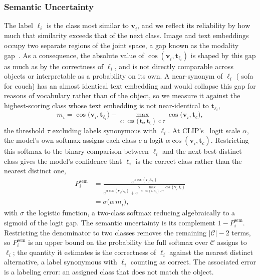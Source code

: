 \subsubsection{Semantic Uncertainty}
The label $\ell^{}_i$ is the class most similar to $\mathbf{v}^{}_i$, and we reflect its reliability by how much that similarity exceeds that of the next class. Image and text embeddings occupy two separate regions of the joint space, a gap known as the modality gap~\cite{liang2022mind}. As a consequence, the absolute value of $\cos(\mathbf{v}^{}_i, \mathbf{t}^{}_{\ell_i})$ is shaped by this gap as much as by the correctness of $\ell^{}_i$, and is not directly comparable across objects or interpretable as a probability on its own. A near-synonym of $\ell^{}_i$ (\eg{} sofa for couch) has an almost identical text embedding and would collapse this gap for reasons of vocabulary rather than of the object, so we measure it against the highest-scoring class whose text embedding is not near-identical to $\mathbf{t}^{}_{\ell_i}$,
\begin{equation}
    m^{}_i = \cos\bigl(\mathbf{v}^{}_i, \mathbf{t}^{}_{\ell_i}\bigr) - \max_{c\, :\, \cos(\mathbf{t}^{}_c,\, \mathbf{t}^{}_{\ell_i}) < \tau} \cos\bigl(\mathbf{v}^{}_i, \mathbf{t}^{}_c\bigr),
\end{equation}
the threshold $\tau$ excluding labels synonymous with $\ell^{}_i$. At CLIP's~\cite{radford2021learning} logit scale $\alpha$, the model's own softmax assigns each class $c$ a logit $\alpha\cos(\mathbf{v}^{}_i, \mathbf{t}^{}_c)$. Restricting this softmax to the binary comparison between $\ell^{}_i$ and the next best distinct class gives the model's confidence that $\ell^{}_i$ is the correct class rather than the nearest distinct one,
\begin{equation}
    \begin{aligned}
        P^{\mathrm{sem}}_i &= \frac{e^{\alpha\cos(\mathbf{v}^{}_i, \mathbf{t}^{}_{\ell_i})}}{e^{\alpha\cos(\mathbf{v}^{}_i, \mathbf{t}^{}_{\ell_i})} + e^{\alpha \max_{c\,:\,\cos(\mathbf{t}^{}_c,\, \mathbf{t}^{}_{\ell_i}) < \tau}\cos(\mathbf{v}^{}_i, \mathbf{t}^{}_c)}} \\ &= \sigma\bigl(\alpha\, m^{}_i\bigr),
    \end{aligned}
    \label{eq:semantic}
\end{equation}
with $\sigma$ the logistic function, a two-class softmax reducing algebraically to a sigmoid of the logit gap. The semantic uncertainty is its complement $1 - P^{\mathrm{sem}}_i$. Restricting the denominator to two classes removes the remaining $|\mathcal{C}| - 2$ terms, so $P^{\mathrm{sem}}_i$ is an upper bound on the probability the full softmax over $\mathcal{C}$ assigns to $\ell^{}_i$; the quantity it estimates is the correctness of $\ell^{}_i$ against the nearest distinct alternative, a label synonymous with $\ell^{}_i$ counting as correct.
The associated error is a labeling error: an assigned class that does not match the object.

